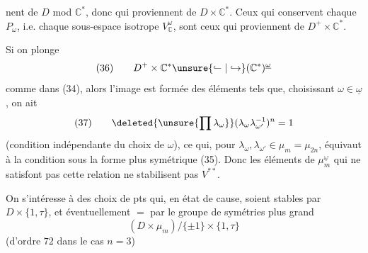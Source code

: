 nent de $D$ mod $\mathbb C^*$, donc qui proviennent de $D\times\mathbb C^*$. Ceux qui conservent  chaque $P_\omega$, i.e. chaque sous-espace isotrope $V_{\mathbb C}^\omega$, sont ceux qui proviennent de $D^+\times\mathbb C^*$.

Si on plonge
\[
(36)\qquad D^+\times\mathbb C^*\unsure{\lhook\joinrel\relbar|\hookrightarrow}(\mathbb C^*)^{\underline\omega}
\]
comme dans (34), alors l'image est formée des éléments \inserted{$(\lambda_\omega)_{\omega\in\underline\omega}$} tels que, choisissant $\omega\in\underline\omega$, on ait
\[
(37)\qquad\deleted{\unsure{\prod\lambda_\omega}}(\lambda_\omega\lambda_{\omega'}^{-1})^n=1
\]
(condition indépendante du choix de $\omega$), ce qui, pour  $\lambda_\omega,\lambda_{\omega'}\in\mu_m=\mu_{2n}$, équivaut à la condition sous la forme plus symétrique  (35). Donc les éléments de $\mu_m^{\underline\omega}$ qui ne satisfont pas cette relation ne stabilisent pas $V^{**}$.

On s'intéresse à des choix de pts  qui, en  état de cause, soient stables par $D\times\{1,\tau\}$, et éventuellement $=$ par le groupe de symétries plus grand
\[
(D\times\mu_m)/\{\pm1\}\times\{1,\tau\}
\]
(d'ordre $72$ dans le cas $n=3$)
